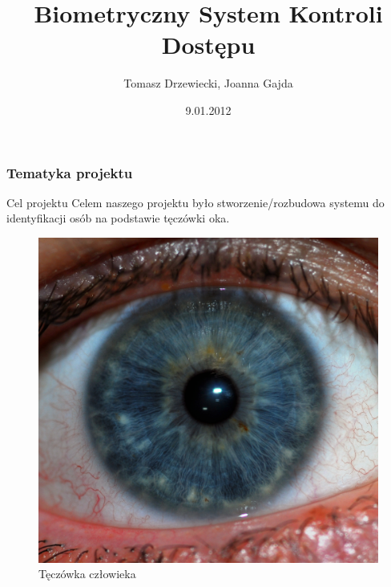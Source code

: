 \documentclass{beamer}
\title[Biometryczny System Kontroli Dostępu]{Biometryczny System Kontroli Dostępu}
\author[T. Drzewiecki, J. Gajda]{Tomasz Drzewiecki, Joanna Gajda}
\date[2012]{9.01.2012}
\institute[AGH-UST]
{Wydział Elektrotechniki, Automatyki, Informatyki i Elektroniki\\ 
Katedra Automatyki
}
\begin{document}
{
 \begin{frame}
   \titlepage
 \end{frame}
}


\begin{frame}
\frametitle{Tematyka projektu}

\begin{block}{Cel projektu}
Celem naszego projektu było stworzenie/rozbudowa systemu do identyfikacji osób na podstawie tęczówki oka.
\end{block}

\begin{figure}
\begin{center}
\includegraphics[scale=0.04]{teczowka.jpg}
\caption{Tęczówka człowieka}
\end{center}
\end{figure}

\end{frame}
\end{document}
